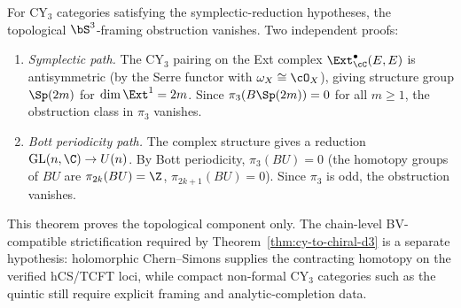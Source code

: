 \begin{theorem}
\label{thm:s3-framing-vanishes}
\ClaimStatusProvedHere
For CY$_3$ categories satisfying the symplectic-reduction hypotheses,
the topological $\bS^3$-framing obstruction vanishes. Two independent
proofs:
\begin{enumerate}[label=\textup{(\roman*)}]
 \item \emph{Symplectic path.} The CY$_3$ pairing on the Ext complex $\Ext^\bullet_\cC(E, E)$ is antisymmetric (by the Serre functor with $\omega_X \cong \cO_X$), giving structure group $\Sp(2m)$ for $\dim \Ext^1 = 2m$. Since $\pi_3(B\Sp(2m)) = 0$ for all $m \geq 1$, the obstruction class in $\pi_3$ vanishes.
 \item \emph{Bott periodicity path.} The complex structure gives a reduction $\mathrm{GL}(n, \C) \to U(n)$. By Bott periodicity, $\pi_3(BU) = 0$ (the homotopy groups of $BU$ are $\pi_{2k}(BU) = \Z$, $\pi_{2k+1}(BU) = 0$). Since $\pi_3$ is odd, the obstruction vanishes.
\end{enumerate}
This theorem proves the topological component only. The chain-level
BV-compatible strictification required by
Theorem~\ref{thm:cy-to-chiral-d3} is a separate hypothesis:
holomorphic Chern--Simons supplies the contracting homotopy on the
verified hCS/TCFT loci, while compact non-formal CY$_3$ categories such
as the quintic still require explicit framing and analytic-completion
data.
\end{theorem}

